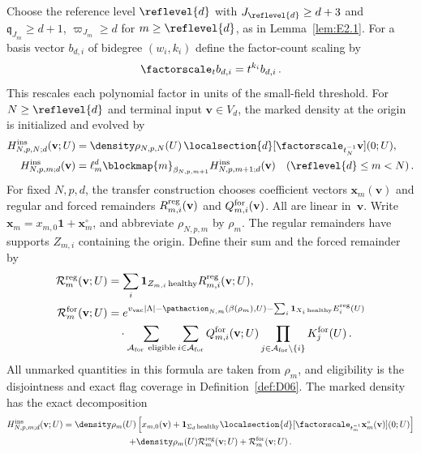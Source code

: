 Choose the reference level $\reflevel{d}$ with $J_{\reflevel{d}}\ge d+3$ and $\mathfrak q_{J_m}\ge d+1$, $\varpi_{J_m}\ge d$ for $m\ge\reflevel{d}$, as in Lemma~\ref{lem:E2.1}. For a basis vector $b_{d,i}$ of bidegree $(w_i,k_i)$ define the factor-count scaling by
\begin{equation*}
\factorscale_t b_{d,i}=t^{k_i}b_{d,i}\,.
\end{equation*}
This rescales each polynomial factor in units of the small-field threshold. For $N\ge\reflevel{d}$ and terminal input $\mathbf v\in V_d$, the marked density at the origin is initialized and evolved by
\begin{align}\label{eq:I12-marked-evolution}
H^{\rm ins}_{N,p,N;d}(\mathbf v;U)
&=\density\rho_{N,p,N}(U)\,
\localsection{d}[\factorscale_{t_N^{-1}}\mathbf v](0;U),\\
H^{\rm ins}_{N,p,m;d}(\mathbf v)
&=\ell_m^d\blockmap{m}_{\beta_{N,p,m+1}}
H^{\rm ins}_{N,p,m+1;d}(\mathbf v)
\quad(\reflevel{d}\le m<N)\,.
\end{align}
For fixed $N,p,d$, the transfer construction chooses coefficient vectors $\mathbf x_m(\mathbf v)$ and regular and forced remainders $R_{m,i}^{\rm reg}(\mathbf v)$ and $Q_{m,i}^{\rm for}(\mathbf v)$. All are linear in~$\mathbf v$. Write $\mathbf x_m=x_{m,0}\mathbf1+\mathbf x_m^\circ$, and abbreviate $\rho_{N,p,m}$ by $\rho_m$. The regular remainders have supports $Z_{m,i}$ containing the origin. Define their sum and the forced remainder by
\begin{align}\label{eq:I12-marked-remainders}
\mathcal R_m^{\rm reg}(\mathbf v;U)
&=\sum_i\mathbf1_{Z_{m,i}\,\mathrm{healthy}}R_{m,i}^{\rm reg}(\mathbf v;U),\notag\\
\mathcal R_m^{\rm for}(\mathbf v;U)
&=e^{v_{\rm vac}|\Lambda|-\pathaction_{N,m}(\beta(\rho_m),U)
-\sum_i\mathbf1_{X_i\,\mathrm{healthy}}E_i^{\rm reg}(U)}\notag\\
&\quad\cdot\sum_{\mathcal A_{\rm for}\ {\rm eligible}}\sum_{i\in\mathcal A_{\rm for}}
Q_{m,i}^{\rm for}(\mathbf v;U)\prod_{j\in\mathcal A_{\rm for}\setminus\{i\}}K_j^{\rm for}(U)\,.
\end{align}
All unmarked quantities in this formula are taken from $\rho_m$, and eligibility is the disjointness and exact flag coverage in Definition~\ref{def:D06}. The marked density has the exact decomposition
\begin{multline}\label{eq:I12-marked-representation}
H^{\rm ins}_{N,p,m;d}(\mathbf v;U)=\density\rho_m(U)\left[
x_{m,0}(\mathbf v)+\mathbf1_{\Sigma_d\,\mathrm{healthy}}
\localsection{d}[\factorscale_{t_m^{-1}}\mathbf x_m^\circ(\mathbf v)](0;U)\right]\\
+\density\rho_m(U)\mathcal R_m^{\rm reg}(\mathbf v;U)
+\mathcal R_m^{\rm for}(\mathbf v;U)\,.
\end{multline}
